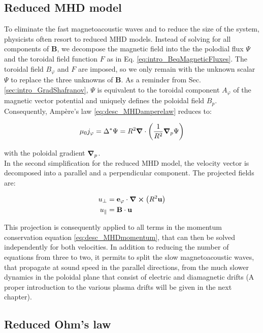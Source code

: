 \subsection{Reduced MHD model}
\label{ssec:desc_reducedMHD}
To eliminate the fast magnetoacoustic waves and to reduce the size of the system, physicists often resort to reduced MHD models. Instead of solving for all components of $\mathbf{B}$, we decompose the magnetic field into the the polodial flux $\Psi$ and the toroidal field function $F$ as in Eq. \ref{eq:intro_BeqMagneticFluxes}. The toroidal field $B_\varphi$ and $F$ are imposed, so we only remain with the unknown scalar $\Psi$ to replace the three unknowns of $\mathbf{B}$. As a reminder from Sec. \ref{sec:intro_GradShafranov}, $\Psi$ is equivalent to the toroidal component $A_\varphi$ of the magnetic vector potential and uniquely defines the poloidal field $B_p$. Consequently, Ampère's law \ref{eq:desc_MHDamperelaw} reduces to: 

\begin{equation}
	\mu_0 j_\varphi = \Delta^* \Psi = R^2\grad\cdot\left(\frac{1}{R^2}\grad_p\Psi\right)
\end{equation}

with the poloidal gradient $\grad_p$. \\

In the second simplification for the reduced MHD model, the velocity vector is decomposed into a parallel and a perpendicular component. The projected fields are:

\begin{align}
	u_\perp     &= \mathbf{e}_\varphi\cdot \grad\cross\left(R^2\mathbf{u}\right)  \\
	u_\parallel &= \mathbf{B}\cdot\mathbf{u} \\
\end{align}

This projection is consequently applied to all terms in the momentum conservation equation \ref{eq:desc_MHDmomentum}, that can then be solved independently for both velocities. In addition to reducing the number of equations from three to two, it permits to split the slow magnetoacoustic waves, that propagate at sound speed in the parallel directions, from the much slower dynamics in the poloidal plane that consist of electric and diamagnetic drifts (A proper introduction to the various plasma drifts will be given in the next chapter). 



\subsection{Reduced Ohm's law}
 
